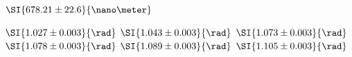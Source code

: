 $\SI{678.21 \pm 22.6}{\nano\meter}$

$\SI{1.027 \pm 0.003}{\rad}$
$\SI{1.043 \pm 0.003}{\rad}$
$\SI{1.073 \pm 0.003}{\rad}$
$\SI{1.078 \pm 0.003}{\rad}$
$\SI{1.089 \pm 0.003}{\rad}$
$\SI{1.105 \pm 0.003}{\rad}$